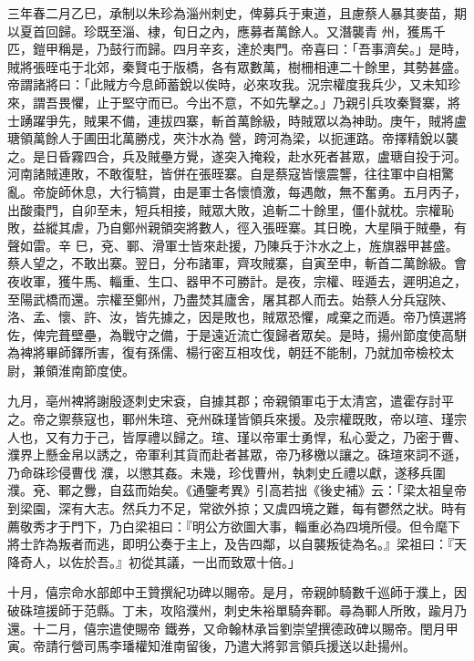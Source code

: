 \begin{pinyinscope}
 三年春二月乙巳，承制以朱珍為淄州刺史，俾募兵于東道，且慮蔡人暴其麥苗，期以夏首回歸。珍既至淄、棣，旬日之內，應募者萬餘人。又潛襲青
 州，獲馬千匹，鎧甲稱是，乃鼓行而歸。四月辛亥，達於夷門。帝喜曰：「吾事濟矣。」是時，賊將張晊屯于北郊，秦賢屯于版橋，各有眾數萬，樹柵相連二十餘里，其勢甚盛。帝謂諸將曰：「此賊方今息師蓄銳以俟時，必來攻我。況宗權度我兵少，又未知珍來，謂吾畏懼，止于堅守而已。今出不意，不如先擊之。」乃親引兵攻秦賢寨，將士踴躍爭先，賊果不備，連拔四寨，斬首萬餘級，時賊眾以為神助。庚午，賊將盧瑭領萬餘人于圃田北萬勝戍，夾汴水為
 營，跨河為梁，以扼運路。帝擇精銳以襲之。是日昏霧四合，兵及賊壘方覺，遂突入掩殺，赴水死者甚眾，盧瑭自投于河。河南諸賊連敗，不敢復駐，皆併在張晊寨。自是蔡寇皆懷震讋，往往軍中自相驚亂。帝旋師休息，大行犒賞，由是軍士各懷憤激，每遇敵，無不奮勇。五月丙子，出酸棗門，自卯至未，短兵相接，賊眾大敗，追斬二十餘里，僵仆就枕。宗權恥敗，益縱其虐，乃自鄭州親領突將數人，徑入張晊寨。其日晚，大星隕于賊壘，有聲如雷。辛
 巳，兗、鄆、滑軍士皆來赴援，乃陳兵于汴水之上，旌旗器甲甚盛。蔡人望之，不敢出寨。翌日，分布諸軍，齊攻賊寨，自寅至申，斬首二萬餘級。會夜收軍，獲牛馬、輜重、生口、器甲不可勝計。是夜，宗權、晊遁去，遲明追之，至陽武橋而還。宗權至鄭州，乃盡焚其廬舍，屠其郡人而去。始蔡人分兵寇陜、洛、孟、懷、許、汝，皆先據之，因是敗也，賊眾恐懼，咸棄之而遁。帝乃慎選將佐，俾完葺壁壘，為戰守之備，于是遠近流亡復歸者眾矣。是時，揚州節度使高駢
 為裨將畢師鐸所害，復有孫儒、楊行密互相攻伐，朝廷不能制，乃就加帝檢校太尉，兼領淮南節度使。



 九月，亳州裨將謝殷逐刺史宋袞，自據其郡；帝親領軍屯于太清宮，遣霍存討平之。帝之禦蔡寇也，鄆州朱瑄、兗州硃瑾皆領兵來援。及宗權既敗，帝以瑄、瑾宗人也，又有力于己，皆厚禮以歸之。瑄、瑾以帝軍士勇悍，私心愛之，乃密于曹、濮界上懸金帛以誘之，帝軍利其貨而赴者甚眾，帝乃移檄以讓之。硃瑄來詞不遜，乃命硃珍侵曹伐
 濮，以懲其姦。未幾，珍伐曹州，執刺史丘禮以獻，遂移兵圍濮。兗、鄆之釁，自茲而始矣。《通鑒考異》引高若拙《後史補》云：「梁太祖皇帝到梁園，深有大志。然兵力不足，常欲外掠；又虞四境之難，每有鬱然之狀。時有薦敬秀才于門下，乃白梁祖曰：『明公方欲圖大事，輜重必為四境所侵。但令麾下將士詐為叛者而逃，即明公奏于主上，及告四鄰，以自襲叛徒為名。』梁祖曰：『天降奇人，以佐於吾。』初從其議，一出而致眾十倍。」



 十月，僖宗命水部郎中王贊撰紀功碑以賜帝。是月，帝親帥騎數千巡師于濮上，因破硃瑄援師于范縣。丁未，攻陷濮州，刺史朱裕單騎奔鄆。尋為鄆人所敗，踰月乃還。十二月，僖宗遣使賜帝
 鐵券，又命翰林承旨劉崇望撰德政碑以賜帝。閏月甲寅。帝請行營司馬李璠權知淮南留後，乃遣大將郭言領兵援送以赴揚州。




\end{pinyinscope}
